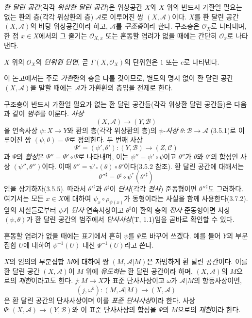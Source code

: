 \begin{env}[4.1.1]
\label{0.4.1.1-ko}
\emph{환 달린 공간}(각각 \emph{위상환 달린 공간})은 위상공간 $X$와 $X$ 위의 반드시 가환일 필요는 없는 환의 층(각각 위상환의 층) $\mathcal A$로 이루어진 쌍 $(X,\mathcal A)$이다. $X$를 환 달린 공간 $(X,\mathcal A)$의 바탕
위상공간이라 하고, $\mathcal A$를 \emph{구조층}이라 한다. 구조층은 $\mathcal O_X$로 나타내며, 한 점 $x\in X$에서의 그 줄기는 $\mathcal O_{X,x}$ 또는 혼동할 염려가 없을 때에는 간단히 $\mathcal O_x$로 나타낸다.

$X$ 위의 $\mathcal O_X$의 \emph{단위원 단면}, 곧 $\Gamma(X,\mathcal O_X)$의 단위원은 $1$ 또는 $e$로 나타낸다.

이 논고에서는 주로 \emph{가환}환의 층을 다룰 것이므로, 별도의 명시 없이 환 달린 공간 $(X,\mathcal A)$을 말할 때에는 $\mathcal A$가 가환환의 층임을 전제로 한다.

구조층이 반드시 가환일 필요가 없는 환 달린 공간들(각각 위상환 달린 공간들)은 다음과 같이 \emph{범주}를 이룬다. \emph{사상}
\[
  (X,\mathcal A)\longrightarrow(Y,\mathcal B)
\]
을 연속사상 $\psi:X\to Y$와 환의 층(각각 위상환의 층)의 $\psi$-\emph{사상} $\theta:\mathcal B\to\mathcal A$ (3.5.1)로 이루어진 쌍 $(\psi,\theta)=\Psi$로 정의한다. 두 번째 사상
\[
  \Psi'=(\psi',\theta'):(Y,\mathcal B)\longrightarrow(Z,\mathcal C)
\]
과 $\Psi$의 \emph{합성}은 $\Psi''=\Psi'\circ\Psi$로 나타내며, 이는 $\psi''=\psi'\circ\psi$이고 $\theta''$가 $\theta$와 $\theta'$의 합성인 사상 $(\psi'',\theta'')$이다. 이때 $\theta''=\psi'_*(\theta)\circ\theta'$이다(3.5.2 참조). 환 달린 공간에 대해서는
\[
  \theta''^\sharp
  =\theta^\sharp\circ\psi^*(\theta'^\sharp)
\]
임을 상기하자(3.5.5). 따라서 $\theta'^\sharp$과 $\theta^\sharp$이 \emph{단사}(각각 \emph{전사}) 준동형이면 $\theta''^\sharp$도 그러하다. 여기서는 모든 $x\in X$에 대하여 $\psi_x\circ\rho_{\psi(x)}$가 동형이라는 사실을 함께 사용한다(3.7.2). 앞의 사실들로부터 $\psi$가 \emph{단사} 연속사상이고 $\theta^\sharp$이 환의 층의 \emph{전사} 준동형이면 사상 $(\psi,\theta)$가 환 달린 공간의 범주에서 \emph{단사사상}(T, 1.1)임을 곧바로 확인할 수 있다.

혼동할 염려가 없을 때에는 표기에서 흔히 $\psi$를 $\Psi$로 바꾸어 쓰겠다. 예를 들어 $Y$의 부분집합 $U$에 대하여 $\psi^{-1}(U)$ 대신 $\Psi^{-1}(U)$라고 쓴다.
\end{env}

\begin{env}[4.1.2]
\label{0.4.1.2-ko}
$X$의 임의의 부분집합 $M$에 대하여 쌍 $(M,\mathcal A|M)$은 자명하게 환 달린 공간이다. 이를 환 달린 공간 $(X,\mathcal A)$이 $M$ 위에 \emph{유도하는} 환 달린 공간이라 하며, $(X,\mathcal A)$의 $M$으로의 \emph{제한}이라고도 한다. $j:M\to X$가 표준 단사사상이고 $\omega$가 $\mathcal A|M$의 항등사상이면,
\[
  (j,\omega^b):(M,\mathcal A|M)\longrightarrow(X,\mathcal A)
\]
은 환 달린 공간의 단사사상이며 이를 \emph{표준 단사사상}이라 한다. 사상 $\Psi:(X,\mathcal A)\to(Y,\mathcal B)$와 이 표준 단사사상의 합성을 $\Psi$의 $M$으로의 \emph{제한}이라 한다.
\end{env}

